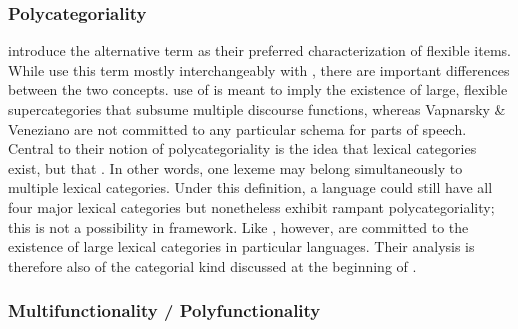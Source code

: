 \subsubsection{Polycategoriality}
\label{sec:2.3.1.2}

\textcite[4]{VapnarskyVeneziano2017a} introduce the alternative term  as their preferred characterization of flexible items.  While \citeauthor{VapnarskyVeneziano2017a} use this term mostly interchangeably with , there are important differences between the two concepts.  use of  is meant to imply the existence of large, flexible supercategories that subsume multiple discourse functions, whereas Vapnarsky \& Veneziano are not committed to any particular schema for parts of speech. Central to their notion of polycategoriality is the idea that lexical categories exist, but that . In other words, one lexeme may belong simultaneously to multiple lexical categories. Under this definition, a language could still have all four major lexical categories but nonetheless exhibit rampant polycategoriality; this is not a possibility in  framework. Like \citeauthor{Hengeveld1992}, however, \citeauthor{VapnarskyVeneziano2017a} are committed to the existence of large lexical categories in particular languages. Their analysis is therefore also of the categorial kind discussed at the beginning of .

\subsubsection{Multifunctionality / Polyfunctionality}
\label{sec:2.3.1.3}

